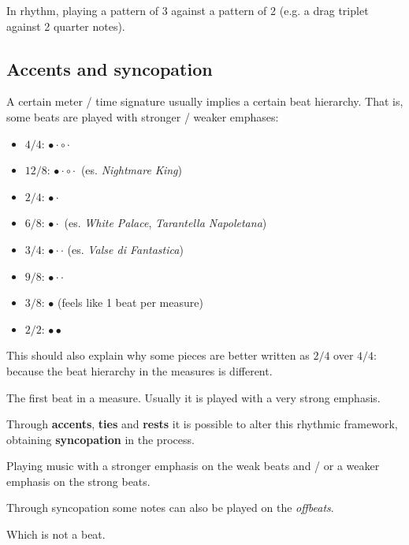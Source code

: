 \begin{definition}
    In rhythm, playing a pattern of 3 against a pattern of 2 (e.g. a drag triplet against 2 quarter notes).
\end{definition}

\subsection{Accents and syncopation}
A certain meter / time signature usually implies a certain beat hierarchy. That is, some beats are played with stronger / weaker emphases:
\begin{itemize}
    \item $4/4$: $\bullet \cdot \circ \cdot$
    \item $12/8$: $\bullet \cdot \circ \cdot$ (es. \emph{Nightmare King})
    \item $2/4$: $\bullet \cdot$
    \item $6/8$: $\bullet \cdot$ (es. \emph{White Palace}, \emph{Tarantella Napoletana})
    \item $3/4$: $\bullet \cdot \cdot$ (es. \emph{Valse di Fantastica})
    \item $9/8$: $\bullet \cdot \cdot$
    \item $3/8$: $\bullet$ (feels like 1 beat per measure)
    \item $2/2$: $\bullet \bullet$
\end{itemize}

This should also explain why some pieces are better written as $2/4$ over $4/4$: because the beat hierarchy in the measures is different.

\begin{definition}[Downbeat]
    The first beat in a measure. Usually it is played with a very strong emphasis.
\end{definition}

Through \textbf{accents}, \textbf{ties} and \textbf{rests} it is possible to alter this rhythmic framework, obtaining \textbf{syncopation} in the process.

\begin{definition}[Syncopation]
    Playing music with a stronger emphasis on the weak beats and / or a weaker emphasis on the strong beats.
\end{definition}

Through syncopation some notes can also be played on the \emph{offbeats}.

\begin{definition}[Offbeat]
    Which is not a beat.
\end{definition}

